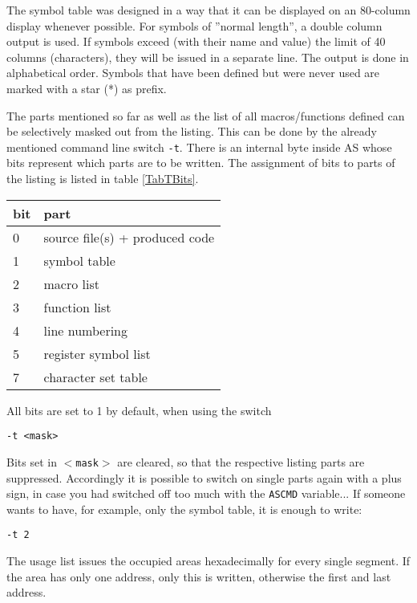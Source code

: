 \documentclass[12pt,twoside]{report}
\newcommand{\tty}[1]{{\tt #1}}
\newcommand{\asname}{{AS}}
\begin{document}
The symbol table was designed in a way that it can be displayed on an
80-column display whenever possible. For symbols of ''normal length'',
a double column output is used.  If symbols exceed (with their name
and value) the limit of 40 columns (characters), they will be issued
in a separate line. The output is done in alphabetical order.
Symbols that have been defined but were never used are marked with a
star (*) as prefix.

The parts mentioned so far as well as the list of all macros/functions
defined can be selectively masked out from the listing.
This can be done by the already mentioned command line switch \tty{-t}.
There is an internal byte inside \asname{} whose bits represent which parts
are to be written.  The assignment of bits to parts of the listing is
listed in table \ref{TabTBits}.
\par
\begin{table*}[htb]
\begin{center}\begin{tabular}{|l|l|}
\hline
bit &  part \\
\hline
\hline
0   & source file(s) + produced code \\
1   & symbol table \\
2   & macro list \\
3   & function list \\
4   & line numbering \\
5   & register symbol list \\
7   & character set table \\
\hline
\end{tabular}\end{center}
\caption{Assignment of Bits to Listing Components\label{TabTBits}}
\end{table*}
All bits are set to 1 by default, when using the switch
\begin{verbatim}
-t <mask>
\end{verbatim}
Bits set in \tty{$<$mask$>$} are cleared, so that the respective listing
parts are suppressed.  Accordingly it is possible to switch on single
parts again with a plus sign, in case you had switched off too much
with the \tty{ASCMD} variable... If someone wants to have, for example,
only the symbol table, it is enough to write:
\begin{verbatim}
-t 2
\end{verbatim}
The usage list issues the occupied areas hexadecimally for every
single segment.  If the area has only one address, only this is written,
otherwise the first and last address.
\end{document}
